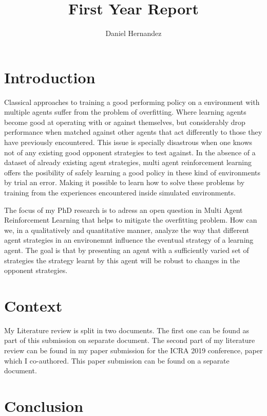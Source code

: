 \documentclass{article}
\title{\textbf{First Year Report}}
\author{Daniel Hernandez}
\date{ }
\begin{document}
\maketitle


\newpage

\section{Introduction}
Classical approaches to training a good performing policy on a environment with multiple agents suffer from the problem of overfitting. Where learning agents become good at operating with or against themselves, but considerably drop performance when matched against other agents that act differently to those they have previously encountered. This issue is specially disastrous when one knows not of any existing good opponent strategies to test against. In the absence of a dataset of already existing agent strategies, multi agent reinforcement learning offers the posibility of safely learning a good policy in these kind of environments by trial an error. Making it possible to learn how to solve these problems by training from the experiences encountered inside simulated environments.

The focus of my PhD research is to adress an open question in Multi Agent Reinforcement Learning that helps to mitigate the overfitting problem. How can we, in a qualitatively and quantitative manner, analyze the way that different agent strategies in an environemnt influence the eventual strategy of a learning agent. The goal is that by presenting an agent with a sufficiently varied set of strategies the strategy learnt by this agent will be robust to changes in the opponent strategies.

\section{Context}

My Literature review is split in two documents. The first one can be found as part of this submission on separate document. The second part of my literature review can be found in my paper submission for the ICRA 2019 conference, paper which I co-authored. This paper submission can be found on a separate document.

\section{Conclusion}
\end{document}
